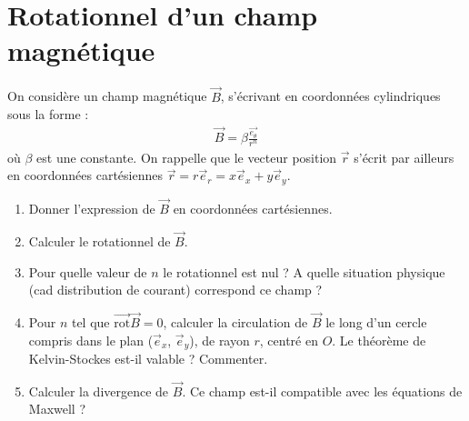 \newpage

\section{Rotationnel d'un champ magnétique}

On considère un champ magnétique $\vec{B}$, s'écrivant en coordonnées cylindriques sous la forme :
\begin{align*}
  \vec{B}=\beta\frac{\vec{e_\theta}}{r^{n}}
\end{align*}
où $\beta$ est une constante. On rappelle que le vecteur position $\vec{r}$ s'écrit par ailleurs en coordonnées cartésiennes $\vec{r}=r\vec{e}_r=x\vec{e}_x+y\vec{e}_y$.

\begin{enumerate}

	\item Donner l'expression de $\vec{B}$ en coordonnées cartésiennes. 

	\item Calculer le rotationnel de $\vec{B}$.
	
	\item Pour quelle valeur de $n$ le rotationnel est nul ? A quelle situation physique (cad distribution de courant) correspond ce champ ? 
	
	\item Pour $n$ tel que $\vec{\mathrm{rot}}\vec{B}=0$, calculer la circulation de $\vec{B}$ le long d'un cercle compris dans le plan ($\vec{e}_x$, $\vec{e}_y$), de rayon $r$, centré en $O$. Le théorème de Kelvin-Stockes est-il valable ? Commenter.
	
	\item Calculer la divergence de $\vec{B}$. Ce champ est-il compatible avec les équations de Maxwell ?

\end{enumerate}

\newpage

